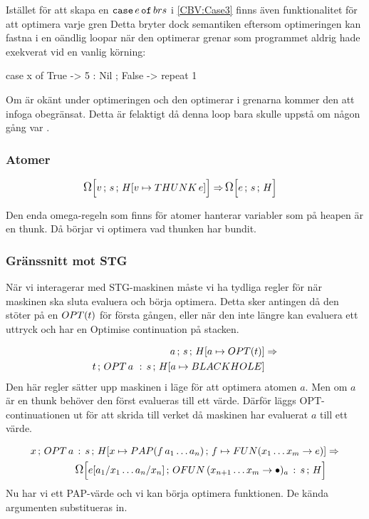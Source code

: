 \documentclass[../Optimise]{subfiles}
\begin{document}
Istället för att skapa en $\eCase e brs$ i \eqref{CBV:Case3} finns även
funktionalitet för att
optimera varje gren Detta bryter dock semantiken eftersom optimeringen kan fastna
i en oändlig loopar när den optimerar grenar som programmet aldrig hade exekverat
vid en vanlig körning: 

\begin{codeEx}
case x of
    { True  -> 5 : Nil
    ; False -> repeat 1
    }
\end{codeEx}

Om  är okänt under optimeringen och den optimerar i grenarna kommer den
att infoga  obegränsat. Detta är felaktigt då denna loop bara skulle uppstå
om  någon gång var .

\subsubsection{Atomer}
\begin{align}
\OMEGA s{\heap{v}{\THUNK{e}}}v \Rightarrow &\, \OMEGA sHe
\end{align}

Den enda omega-regeln som finns för atomer hanterar variabler som på 
heapen är en thunk. Då börjar vi optimera vad thunken har bundit.

\subsubsection{Gränssnitt mot STG}
När vi interagerar med STG-maskinen måste vi ha tydliga regler
för när maskinen ska sluta evaluera och börja optimera. Detta sker
antingen då den stöter på en $\OPT t$ för första gången, eller när den
inte längre kan evaluera ett uttryck och har en Optimise continuation
på stacken.

\begin{align}
\mc as{\heap a{\OPT t}} & \Rightarrow\\
\mc t{\cOPT{a\,}s}{\heap a{\BH}} \nonumber
\end{align}
Den här regler sätter upp maskinen i läge för att optimera atomen $a$. Men om $a$
är en thunk behöver den först evalueras till ett värde. Därför läggs
OPT-continuationen ut för att skrida till verket då maskinen har evaluerat
$a$ till ett värde.

\begin{align}
\mc x{\cOPT as}{\heapp x{\PAP f{a_{1}\ldots a_{n}}}f{\FUN{x_{1}\ldots x_{m}}e}} & \Rightarrow\\
\OMEGA{\cOFUN{x_{n+1}\ldots x_{m}}as}H{e[a_{1}/x_{1}\ldots a_{n}/x_{n}]} \nonumber
\end{align}
Nu har vi ett PAP-värde och vi kan börja optimera funktionen. De kända 
argumenten substitueras in.
\end{document}
